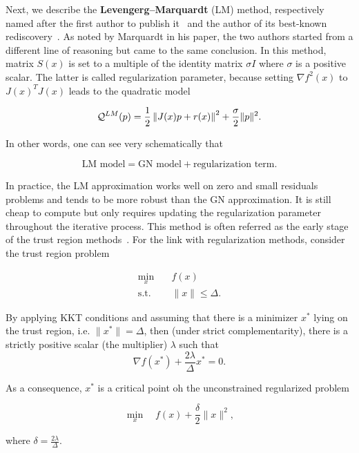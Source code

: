 \documentclass[10pt]{article}
\numberwithin{equation}{section}
\begin{document}
	 Next, we describe the \textbf{Levengerg--Marquardt} (LM) method, respectively named after the first author to publish it~\cite{levenberg:1944} and the author of its best-known rediscovery~\cite{marquardt:1963}. As noted by Marquardt in his paper, the two authors started from a different line of reasoning but came to the same conclusion. In this method, matrix $S(x)$ is set to a multiple of the identity matrix $\sigma I$ where $\sigma$ is a positive scalar. The latter is called regularization parameter, because setting  $\nabla f^2(x)$ to $J(x)^TJ(x)$ leads to the quadratic model 
	 
	 \begin{equation}\label{eq:lm_model}
	 	{\mathcal{Q}}^{LM}(p) =  \dfrac{1}{2} \left\Vert J(x)p+r(x) \right\Vert^2 + \dfrac{\sigma}{2} \|p\|^2.
	 \end{equation}
	 
	 In other words, one can see very schematically that
	 
	\[\text{LM model} = \text{GN model} + \text{regularization term}.\]
	
	In practice, the LM approximation works well on zero and small residuals problems and tends to be more robust than the GN approximation. It is still cheap to compute but only requires updating the regularization parameter throughout the iterative process. This method is often referred as the early stage of the trust region methods~\cite{conn-etal:2000}. For the link with regularization methods, consider the trust region problem
	 
	 \begin{equation*}
	 	\begin{aligned}
	 		\min_x \quad & f(x) \\
	 		\text{s.t.} \quad & \|x\| \le \Delta.
	 	\end{aligned}
	 \end{equation*}
	 
	 By applying KKT conditions and assuming that there is a minimizer $x^*$ lying on the trust region, i.e. $\|x^*\|=\Delta$, then (under strict complementarity), there is a strictly positive scalar (the multiplier) $\lambda$ such that
	 \[\nabla f(x^*) + \dfrac{2\lambda}{\Delta}x^*=0.\]
	 
	 As a consequence, $x^*$ is a critical point oh the unconstrained regularized problem
	 
	 \[\min_x \quad f(x) + \dfrac{\delta}{2} \|x\|^2,\]
	 
	 where $\delta=\frac{2\lambda}{\Delta}$.
	 
\end{document}
